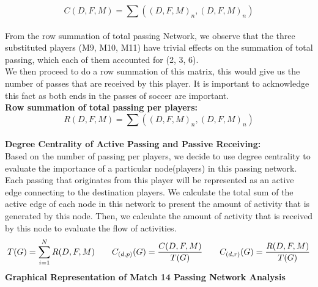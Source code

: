 \documentclass[12pt]{article}
\begin{document}
\begin{equation*}
C(D,F,M)=\sum{((D,F,M)_n,(D,F,M)_n)}
\end{equation*}\\
From the row summation of total passing Network, we observe that the three substituted players (M9, M10, M11) have trivial effects on the summation of total passing, which each of them accounted for (2, 3, 6). \\
\newline
We then proceed to do a row summation of this matrix, this would give us the number of passes that are received by this player. It is important to acknowledge this fact as both ends in the passes of soccer are important.\\
\newline
\textbf{Row summation of total passing per players:}
\begin{equation*}
R(D,F,M)=\sum{((D,F,M)_n,(D,F,M)_n)}
\end{equation*}\\
\newline
\textbf{Degree Centrality of Active Passing and Passive Receiving:}\\\newline
Based on the number of passing per players, we decide to use degree centrality to evaluate the importance of a particular node(players) in this passing network. Each passing that originates from this player will be represented as an active edge connecting to the destination players. We calculate the total sum of the active edge of each node in this network to present the amount of activity that is generated by this node. Then, we calculate the amount of activity that is received by this node to evaluate the flow of activities. 
\begin{equation*}
T(G) = \sum_{i=1}^{N} R(D,F,M)\newline \qquad
	C_{(d,p)}(G) = \frac{C(D,F,M)}{T(G)}\newline \qquad
	C_{(d,r)}(G) = \frac{R(D,F,M)}{T(G)}\newline
\end{equation*}
\newline
\newline
\newline
\textbf{Graphical Representation of Match 14 Passing Network Analysis}
\newline
\end{document}
